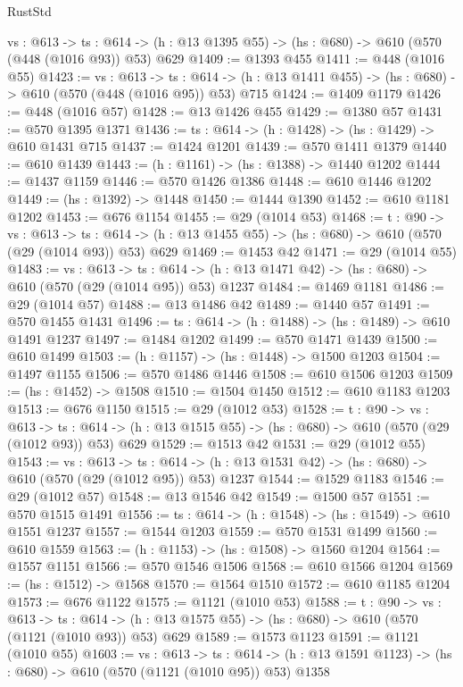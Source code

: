 \begin{lexlean}{RustStd}
\begin{coremodule}
  {vs : @613} ->
  {ts : @614} -> (h : @13 @1395 @55) -> (hs : @680) -> @610 (@570 (@448 (@1016 @93)) @53) @629
@1409 := @1393 @455
@1411 := @448 (@1016 @55)
@1423 := {vs : @613} ->
  {ts : @614} -> (h : @13 @1411 @455) -> (hs : @680) -> @610 (@570 (@448 (@1016 @95)) @53) @715
@1424 := @1409 @1179
@1426 := @448 (@1016 @57)
@1428 := @13 @1426 @455
@1429 := @1380 @57
@1431 := @570 @1395 @1371
@1436 := {ts : @614} -> (h : @1428) -> (hs : @1429) -> @610 @1431 @715
@1437 := @1424 @1201
@1439 := @570 @1411 @1379
@1440 := @610 @1439
@1443 := (h : @1161) -> (hs : @1388) -> @1440 @1202
@1444 := @1437 @1159
@1446 := @570 @1426 @1386
@1448 := @610 @1446 @1202
@1449 := (hs : @1392) -> @1448
@1450 := @1444 @1390
@1452 := @610 @1181 @1202
@1453 := @676 @1154
@1455 := @29 (@1014 @53)
@1468 := {t : @90} ->
  {vs : @613} ->
  {ts : @614} -> (h : @13 @1455 @55) -> (hs : @680) -> @610 (@570 (@29 (@1014 @93)) @53) @629
@1469 := @1453 @42
@1471 := @29 (@1014 @55)
@1483 := {vs : @613} ->
  {ts : @614} -> (h : @13 @1471 @42) -> (hs : @680) -> @610 (@570 (@29 (@1014 @95)) @53) @1237
@1484 := @1469 @1181
@1486 := @29 (@1014 @57)
@1488 := @13 @1486 @42
@1489 := @1440 @57
@1491 := @570 @1455 @1431
@1496 := {ts : @614} -> (h : @1488) -> (hs : @1489) -> @610 @1491 @1237
@1497 := @1484 @1202
@1499 := @570 @1471 @1439
@1500 := @610 @1499
@1503 := (h : @1157) -> (hs : @1448) -> @1500 @1203
@1504 := @1497 @1155
@1506 := @570 @1486 @1446
@1508 := @610 @1506 @1203
@1509 := (hs : @1452) -> @1508
@1510 := @1504 @1450
@1512 := @610 @1183 @1203
@1513 := @676 @1150
@1515 := @29 (@1012 @53)
@1528 := {t : @90} ->
  {vs : @613} ->
  {ts : @614} -> (h : @13 @1515 @55) -> (hs : @680) -> @610 (@570 (@29 (@1012 @93)) @53) @629
@1529 := @1513 @42
@1531 := @29 (@1012 @55)
@1543 := {vs : @613} ->
  {ts : @614} -> (h : @13 @1531 @42) -> (hs : @680) -> @610 (@570 (@29 (@1012 @95)) @53) @1237
@1544 := @1529 @1183
@1546 := @29 (@1012 @57)
@1548 := @13 @1546 @42
@1549 := @1500 @57
@1551 := @570 @1515 @1491
@1556 := {ts : @614} -> (h : @1548) -> (hs : @1549) -> @610 @1551 @1237
@1557 := @1544 @1203
@1559 := @570 @1531 @1499
@1560 := @610 @1559
@1563 := (h : @1153) -> (hs : @1508) -> @1560 @1204
@1564 := @1557 @1151
@1566 := @570 @1546 @1506
@1568 := @610 @1566 @1204
@1569 := (hs : @1512) -> @1568
@1570 := @1564 @1510
@1572 := @610 @1185 @1204
@1573 := @676 @1122
@1575 := @1121 (@1010 @53)
@1588 := {t : @90} ->
  {vs : @613} ->
  {ts : @614} -> (h : @13 @1575 @55) -> (hs : @680) -> @610 (@570 (@1121 (@1010 @93)) @53) @629
@1589 := @1573 @1123
@1591 := @1121 (@1010 @55)
@1603 := {vs : @613} ->
  {ts : @614} -> (h : @13 @1591 @1123) -> (hs : @680) -> @610 (@570 (@1121 (@1010 @95)) @53) @1358

\end{coremodule}
\end{lexlean}
